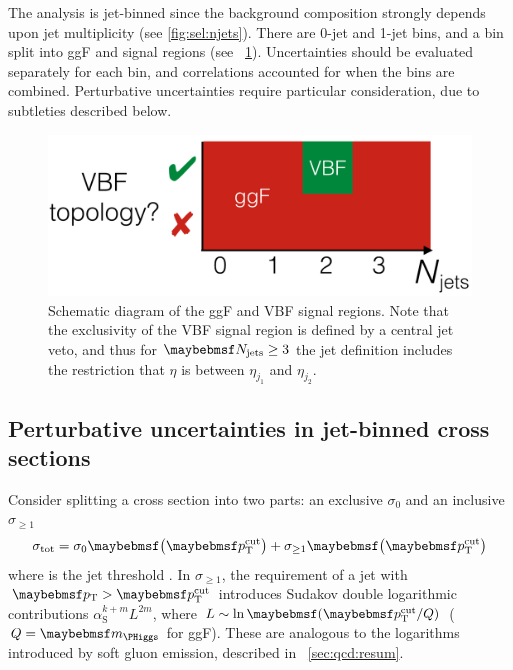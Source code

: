 
The analysis is jet-binned since the background composition strongly depends upon jet 
multiplicity (see \Figure\ref{fig:sel:njets}). There are 0-jet and 1-jet bins, and a 
\twojet bin split into \ac{ggF} and  signal regions (see 
\Figure~\ref{fig:sig:jetbinning}). Uncertainties should be evaluated separately for each 
bin, and correlations accounted for when the bins are combined. Perturbative 
uncertainties require particular consideration, due to subtleties described below.

\begin{figure}
	\includegraphics[width=\mediumfigwidth]{tex/signal/signal_jetbins}
	\caption{Schematic diagram of the \ac{ggF} and \ac{VBF} signal regions. Note that the 
	exclusivity of the \ac{VBF} signal region is defined by a central jet veto, and thus 
	for $\njets \geq 3$ the jet definition includes the restriction that $\eta$ is 
	between $\eta_{j_1}$ and $\eta_{j_2}$.}
	\label{fig:sig:jetbinning}
\end{figure}



\subsection{Perturbative uncertainties in jet-binned cross sections}
\label{sec:ggF:naive}

Consider splitting a cross section into two parts: an exclusive $\sigma_0$ and an 
inclusive $\sigma_{\geq1}$
\begin{equation}
	\sigma_{\total} = \sigma_0 \parenths{\ptcut} + \sigma_{\geq1} \parenths{\ptcut}
\end{equation}
where \ptcut is the jet \pt threshold \cite{YR2}. In $\sigma_{\geq1}$, the requirement of 
a jet with $\pt > \ptcut$ introduces Sudakov double logarithmic contributions 
$\alpha_{\text{S}}^{k+m} L^{2m}$, where $L \sim \ln\parenths{\ptcut/Q}$ ($Q = \mH$ for 
\ac{ggF}). These are analogous to the logarithms introduced by soft gluon emission, 
described in \Section~\ref{sec:qcd:resum}. 

